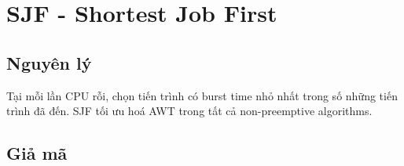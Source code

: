 \section{SJF - Shortest Job First}

\subsection{Nguyên lý}

Tại mỗi lần CPU rỗi, chọn tiến trình có burst time nhỏ nhất trong số những tiến trình 
đã đến. SJF tối ưu hoá AWT trong tất cả non-preemptive algorithms.

\subsection{Giả mã}


